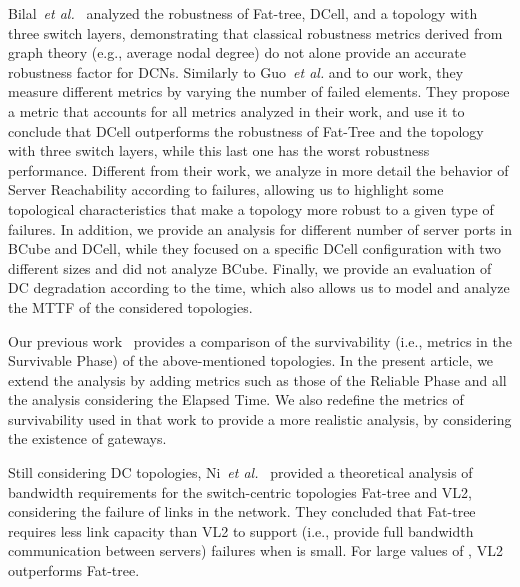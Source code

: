 Bilal~\textit{et al.}~\cite{bilal2013Characterization} analyzed the robustness of Fat-tree, DCell, and a topology with three switch layers, demonstrating that classical robustness metrics derived from graph theory (e.g., average nodal degree) do not alone provide an accurate robustness factor for DCNs. Similarly to Guo~\textit{et al.} and to our work, they measure different metrics by varying the number of failed elements. They propose a metric that accounts for all metrics analyzed in their work, and use it to conclude that DCell outperforms the robustness of Fat-Tree and the topology with three switch layers, while this last one has the worst robustness performance. Different from their work, we analyze in more detail the behavior of Server Reachability according to failures, allowing us to highlight some topological characteristics that make a topology more robust to a given type of failures.
In addition, we provide an analysis for different number of server ports in BCube and DCell, while they focused on a specific DCell configuration with two different sizes and did not analyze BCube. Finally, we provide an evaluation of DC degradation according to the time, which also allows us to model and analyze the MTTF of the considered topologies.

Our previous work~\cite{couto2012Reliability} provides a comparison of the survivability (i.e., metrics in the Survivable Phase) of the above-mentioned topologies. In the present article, we extend the 
analysis by adding metrics such as those of the Reliable Phase and all the analysis considering the Elapsed Time. We also redefine the metrics of survivability used in that work to provide a more realistic analysis, by considering the existence of gateways. 

Still considering DC topologies, Ni~\textit{et al.}~\cite{ni2014provisioning} provided a theoretical analysis of bandwidth requirements for the switch-centric topologies Fat-tree and VL2, considering the failure of  links in the network. They concluded that Fat-tree requires less link capacity than VL2 to support (i.e., provide full bandwidth communication between servers)  failures when  is small. For large values of , VL2 outperforms Fat-tree.


